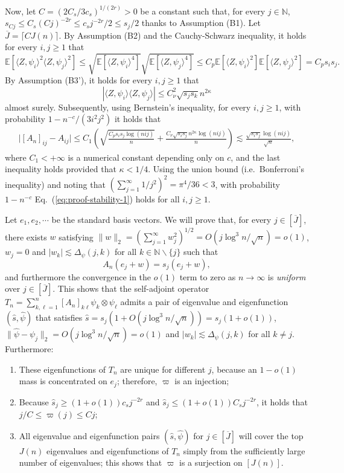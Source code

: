\documentclass[11pt,a4paper]{article}
\renewcommand{\hat}{\widehat}
\renewcommand{\bar}{\overline}
\theoremstyle{definition}
\theoremstyle{plain}
\theoremstyle{remark}
\begin{document}
Now, let $C=(2C_s/3c_s)^{1/(2r)}>0$ be a constant such that, for every $j\in\mathbb N$, $s_{Cj}\leq C_s (Cj)^{-2r} \leq c_sj^{-2r}/2\leq s_j/2$ thanks to Assumption (B1). 
Let $\bar J=\lceil CJ(n)\rceil$.
By Assumption (B2) and the Cauchy-Schwarz inequality, it holds for every $i,j\geq 1$ that 
$$
\mathbb E[\langle Z,\psi_i\rangle^2\langle Z,\psi_j\rangle^2] \leq \sqrt{\mathbb E[\langle Z,\psi_i\rangle^4]}\sqrt{\mathbb E[\langle Z,\psi_j\rangle^4]}
\leq C_p\mathbb E[\langle Z,\psi_i\rangle^2]\mathbb E[\langle Z,\psi_j\rangle^2] = C_ps_is_j.
$$
By Assumption (B3'), it holds for every $i,j\geq 1$ that 
$$
|\langle Z,\psi_i\rangle\langle Z,\psi_j\rangle| \leq C_\nu^2\sqrt{s_js_k}n^{2\kappa}
$$ almost surely.
Subsequently, using Bernstein's inequality, for every $i,j\geq 1$, with probability $1-n^{-c}/(3i^2j^2)$ it holds that 
\begin{align}
\big|[A_n]_{ij}-A_{ij}\big| \leq C_1\left(\sqrt{\frac{C_ps_is_j\log (nij)}{n}} + \frac{C_\nu\sqrt{s_is_j}n^{2\kappa}\log (nij)}{n}\right) \lesssim \frac{\sqrt{s_is_j}\log(nij)}{\sqrt{n}},
\label{eq:proof-stability-1}
\end{align}
where $C_1<+\infty$ is a numerical constant depending only on $c$, and the last inequality holds provided that $\kappa<1/4$.
Using the union bound (i.e.~Bonferroni's inequality) and noting that $(\sum_{j=1}^{\infty}1/j^2)^2=\pi^4/36<3$, with probability $1-n^{-c}$ Eq.~(\ref{eq:proof-stability-1}) holds for all $i,j\geq 1$.

Let $e_1,e_2,\cdots$ be the standard basis vectors.
We will prove that, for every $j\in[\bar J]$, there exists $w$ satisfying $\|w\|_2 =(\sum_{j=1}^{\infty}w_j^2)^{1/2}= O(j\log^3 n/\sqrt{n})=o(1)$, $w_j=0$ and $|w_k|\lesssim \Delta_\psi(j,k)$ for all $k\in\mathbb N\backslash\{j\}$ such that
\begin{equation}
A_n (e_j+w) = s_j(e_j+w),
\label{eq:eigen-an}
\end{equation}
and furthermore the convergence in the $o(1)$ term to zero as $n\to\infty$ is \emph{uniform} over $j\in[\bar J]$.
This shows that the self-adjoint operator $T_n=\sum_{k,\ell=1}^{n}[A_n]_{k\ell}\psi_k\otimes\psi_\ell$ admits a pair of eigenvalue and eigenfunction $(\hat s,\hat\psi)$ that satisfies
$\hat s=s_j(1+O(j\log^3 n/\sqrt{n}))=s_j(1+o(1))$, $\|\hat\psi-\psi_j\|_2=O(j\log^3 n/\sqrt{n})=o(1)$ and $|w_k|\lesssim \Delta_\psi(j,k)$ for all $k\neq j$. 
Furthermore:
\begin{enumerate}
\item These eigenfunctions of $T_n$ are unique for different $j$, because an $1-o(1)$ mass is concentrated on $e_j$; therefore, $\varpi$ is an injection;
\item Because $\hat s_j \geq (1+o(1))c_s j^{-2r}$ and $\hat s_j\leq (1+o(1))C_s j^{-2r}$, it holds that $j/C\leq \varpi(j)\leq Cj$;
\item All eigenvalue and eigenfunction pairs $(\hat s,\hat\psi)$ for $j\in[\bar J]$ will cover the top $J(n)$ eigenvalues and eigenfunctions of $T_n$ simply from the sufficiently large number of eigenvalues;
this shows that $\varpi$ is a surjection on $[J(n)]$.
\end{enumerate}
\end{document}
